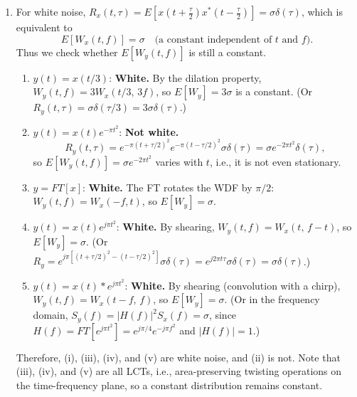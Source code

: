 \documentclass[12pt,a4paper]{article}
\begin{document}
\begin{enumerate}
\begin{enumerate}[label=(\alph*)]
  \item \textbf{Generalized modulation for filter design.} Multiplying the signal by $e^{-j\phi(t)}$, where $\phi(t)=\sum_k a_kt^k$ is an arbitrary (higher-order) polynomial, shifts the time-frequency distribution along the $f$-axis by $-\phi'(t)/2\pi$ (generalized shearing). Therefore:
  \begin{itemize}
    \item A \textbf{curved} signal or noise component can be flattened to a horizontal one, and then separated by a conventional lowpass/bandpass filter. Finally, multiply back by $e^{j\phi(t)}$.
    \item The FRFT can only handle straight cutoff lines (chirps), while the generalized modulation can handle \textbf{non-linear cutoff curves}. Thus it can remove noises with higher-order phases $e^{j(n_kt^k+\cdots+n_1t)}$, e.g., denoising vocal signals whose pitch varies with time.
    \item It only needs a multiplication by a phase function plus conventional FT filtering, so the implementation is simple and the cost is low.
  \end{itemize}
\end{enumerate}

\item For white noise, $R_x(t,\tau)=E[x(t+\frac\tau2)x^*(t-\frac\tau2)]=\sigma\delta(\tau)$, which is equivalent to
\[
E[W_x(t,f)]=\sigma \quad\text{(a constant independent of $t$ and $f$)}.
\]
Thus we check whether $E[W_y(t,f)]$ is still a constant.
\begin{enumerate}[label=(\roman*)]
  \item $y(t)=x(t/3)$: \textbf{White.} By the dilation property, $W_y(t,f)=3W_x(t/3,\,3f)$, so $E[W_y]=3\sigma$ is a constant. (Or $R_y(t,\tau)=\sigma\delta(\tau/3)=3\sigma\delta(\tau)$.)
  \item $y(t)=x(t)e^{-\pi t^2}$: \textbf{Not white.}
  \[
  R_y(t,\tau)=e^{-\pi(t+\tau/2)^2}e^{-\pi(t-\tau/2)^2}\sigma\delta(\tau)=\sigma e^{-2\pi t^2}\delta(\tau),
  \]
  so $E[W_y(t,f)]=\sigma e^{-2\pi t^2}$ varies with $t$, i.e., it is not even stationary.
  \item $y=FT[x]$: \textbf{White.} The FT rotates the WDF by $\pi/2$: $W_y(t,f)=W_x(-f,t)$, so $E[W_y]=\sigma$.
  \item $y(t)=x(t)e^{j\pi t^2}$: \textbf{White.} By shearing, $W_y(t,f)=W_x(t,\,f-t)$, so $E[W_y]=\sigma$. (Or $R_y=e^{j\pi[(t+\tau/2)^2-(t-\tau/2)^2]}\sigma\delta(\tau)=e^{j2\pi t\tau}\sigma\delta(\tau)=\sigma\delta(\tau)$.)
  \item $y(t)=x(t)*e^{j\pi t^2}$: \textbf{White.} By shearing (convolution with a chirp), $W_y(t,f)=W_x(t-f,\,f)$, so $E[W_y]=\sigma$. (Or in the frequency domain, $S_y(f)=|H(f)|^2S_x(f)=\sigma$, since $H(f)=FT[e^{j\pi t^2}]=e^{j\pi/4}e^{-j\pi f^2}$ and $|H(f)|=1$.)
\end{enumerate}
Therefore, (i), (iii), (iv), and (v) are white noise, and (ii) is not. Note that (iii), (iv), and (v) are all LCTs, i.e., area-preserving twisting operations on the time-frequency plane, so a constant distribution remains constant.


\end{enumerate}
\end{document}
